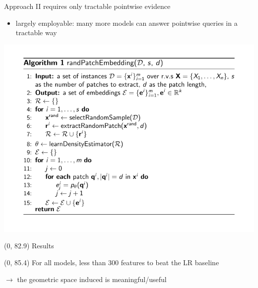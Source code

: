 \documentclass[final]{beamer}
\begin{document}
\begin{frame}{}
\begin{textblock}{25.2}

        Approach II requires only tractable pointwise evidence
        \begin{itemize}
        \item largely employable: many more models can answer pointwise
          queries in a tractable way
        \end{itemize}
        \begin{center}
          \includegraphics[width=0.9\linewidth]{algo_II}
        \end{center}
      \end{textblock}

      

      

      
  
  \begin{textblock}{80}(0, 82.9)
    Results
  \end{textblock}
  
  \begin{textblock}{25.2}(0, 85.4)
    \small
    For all models, less than $300$ features to beat the \textsf{LR}
    baseline\par
    \hspace{30pt}$\rightarrow$ the geometric space induced is meaningful/useful
  \end{textblock}
  

\end{frame}
\end{document}
